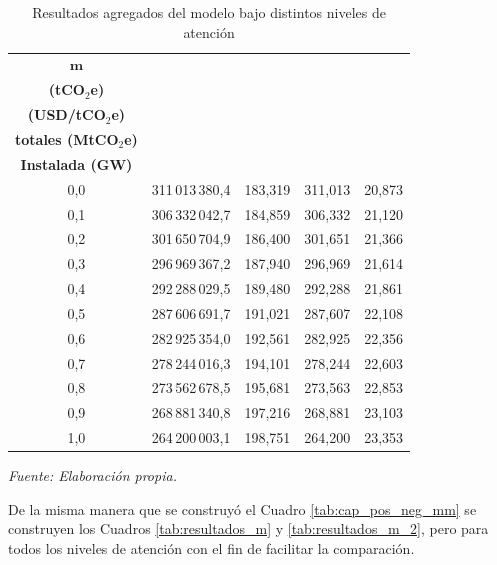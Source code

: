 \begin{table}[H]
\centering
\caption{Resultados agregados del modelo bajo distintos niveles de atención}
\label{tab:resultados_agregados_m}
\renewcommand{\arraystretch}{1.2}
\setlength{\tabcolsep}{8pt}
\small
\begin{tabular}{c c c c c}
\toprule
\textbf{$\boldsymbol{m}$} &
\makecell{\textbf{$\boldsymbol{\theta^*}$} \\ \textbf{(tCO$_2$e)}} &
\makecell{\textbf{$\boldsymbol{\pi^a}$} \\ \textbf{(USD/tCO$_2$e)}} &
\makecell{\textbf{Emisiones} \\ \textbf{totales (MtCO$_2$e)}} &
\makecell{\textbf{Capacidad} \\ \textbf{Instalada (GW)}} \\
\midrule
0,0 & 311\,013\,380,4 & 183,319 & 311,013 & 20,873 \\
0,1 & 306\,332\,042,7 & 184,859 & 306,332 & 21,120 \\
0,2 & 301\,650\,704,9 & 186,400 & 301,651 & 21,366 \\
0,3 & 296\,969\,367,2 & 187,940 & 296,969 & 21,614 \\
0,4 & 292\,288\,029,5 & 189,480 & 292,288 & 21,861 \\
0,5 & 287\,606\,691,7 & 191,021 & 287,607 & 22,108 \\
0,6 & 282\,925\,354,0 & 192,561 & 282,925 & 22,356 \\
0,7 & 278\,244\,016,3 & 194,101 & 278,244 & 22,603 \\
0,8 & 273\,562\,678,5 & 195,681 & 273,563 & 22,853 \\
0,9 & 268\,881\,340,8 & 197,216 & 268,881 & 23,103 \\
1,0 & 264\,200\,003,1 & 198,751 & 264,200 & 23,353 \\
\bottomrule
\end{tabular}

\vspace{0.1cm}
\footnotesize{\textit{Fuente: Elaboración propia.}}

\end{table}

De la misma manera que se construyó el Cuadro \ref{tab:cap_pos_neg_mm} se construyen los Cuadros \ref{tab:resultados_m} y  \ref{tab:resultados_m_2}, pero para todos los niveles de atención con el fin de facilitar la comparación.

